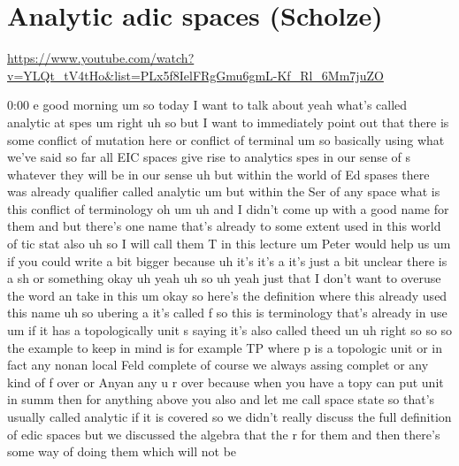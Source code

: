
\section{\ufs Analytic adic spaces (Scholze)}

\url{https://www.youtube.com/watch?v=YLQt_tV4tHo&list=PLx5f8IelFRgGmu6gmL-Kf_Rl_6Mm7juZO}
\renewcommand{\yt}[2]{\href{https://www.youtube.com/watch?v=YLQt_tV4tHo&list=PLx5f8IelFRgGmu6gmL-Kf_Rl_6Mm7juZO&t=#1}{#2}}
\vspace{1em}

\begin{unfinished}{0:00}
e
good
morning  um  so  today  I  want  to  talk  about
yeah  what's  called  analytic  at
spes
um  right  uh  so  but  I  want  to  immediately
point  out  that  there  is  some  conflict  of
mutation  here  or  conflict  of
terminal
um  so  basically  using  what  we've  said  so
far  all  EIC
spaces  give  rise  to  analytics  spes  in
our
sense  of  s  whatever  they  will
be  in  our
sense  uh  but  within  the  world  of  Ed
spases  there  was  already  qualifier
called  analytic
um  but  within  the  Ser  of  any
space  what  is
this  conflict  of  terminology
oh
um
uh  and  I  didn't  come  up  with  a  good  name
for  them  and  but  there's  one  name  that's
already  to  some  extent  used  in  this
world  of  tic  stat  also  uh  so  I  will  call
them  T  in  this
lecture  um  Peter  would  help  us  um  if  you
could  write  a  bit  bigger  because  uh  it's
it's  a  it's  just  a  bit
unclear  there  is  a  sh  or
something  okay  uh
yeah  uh  so
uh  yeah  just  that  I  don't  want  to
overuse  the  word  an  take  in
this  um
okay  so  here's  the  definition  where  this
already  used  this
name  uh  so  ubering
a  it's  called
f  so  this  is  terminology  that's  already
in  use
um  if  it  has  a  topologically  unit
s  saying  it's  also  called  theed
un
uh
right  so  so  so  the  example  to  keep  in
mind  is  for  example  TP  where  p  is  a
topologic
unit  or  in  fact  any  nonan  local
Feld  complete  of  course  we  always  assing
complet  or
any  kind  of  f  over  or  Anyan  any  u
r
over  because  when  you  have  a  topy  can
put  unit  in  summ  then  for  anything  above
you
also  and  let  me  call  space
state
so  that's  usually
called
analytic  if  it  is  covered  so  we  didn't
really  discuss  the  full  definition  of
edic  spaces  but  we  discussed  the  algebra
that  the  r  for  them  and  then  there's
some  way  of  doing  them  which  will  not  be

\end{unfinished}
